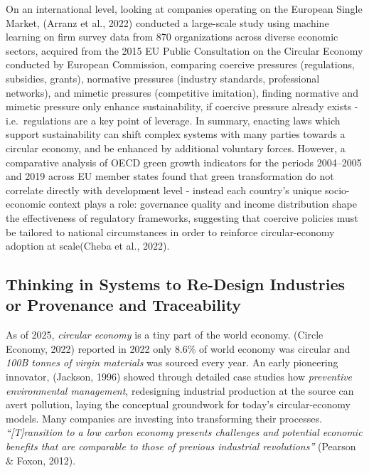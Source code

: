 \documentclass[
  12pt,
  letterpaper,
  DIV=11,
  numbers=noendperiod]{scrartcl}
\begin{document}
On an international level, looking at companies operating on the
European Single Market, (Arranz et al., 2022) conducted a large-scale
study using machine learning on firm survey data from 870 organizations
across diverse economic sectors, acquired from the 2015 EU Public
Consultation on the Circular Economy conducted by European Commission,
comparing coercive pressures (regulations, subsidies, grants), normative
pressures (industry standards, professional networks), and mimetic
pressures (competitive imitation), finding normative and mimetic
pressure only enhance sustainability, if coercive pressure already
exists - i.e.~regulations are a key point of leverage. In summary,
enacting laws which support sustainability can shift complex systems
with many parties towards a circular economy, and be enhanced by
additional voluntary forces. However, a comparative analysis of OECD
green growth indicators for the periods 2004--2005 and 2019 across EU
member states found that green transformation do not correlate directly
with development level - instead each country's unique socio-economic
context plays a role: governance quality and income distribution shape
the effectiveness of regulatory frameworks, suggesting that coercive
policies must be tailored to national circumstances in order to
reinforce circular-economy adoption at scale(Cheba et al., 2022).

\subsection{Thinking in Systems to Re-Design Industries or Provenance
and
Traceability}\label{thinking-in-systems-to-re-design-industries-or-provenance-and-traceability}

As of 2025, \emph{circular economy} is a tiny part of the world economy.
(Circle Economy, 2022) reported in 2022 only 8.6\% of world economy was
circular and \emph{100B tonnes of virgin materials} was sourced every
year. An early pioneering innovator, (Jackson, 1996) showed through
detailed case studies how \emph{preventive environmental management},
redesigning industrial production at the source can avert pollution,
laying the conceptual groundwork for today's circular-economy models.
Many companies are investing into transforming their processes.
\emph{``{[}T{]}ransition to a low carbon economy presents challenges and
potential economic benefits that are comparable to those of previous
industrial revolutions''} (Pearson \& Foxon, 2012).
\end{document}
